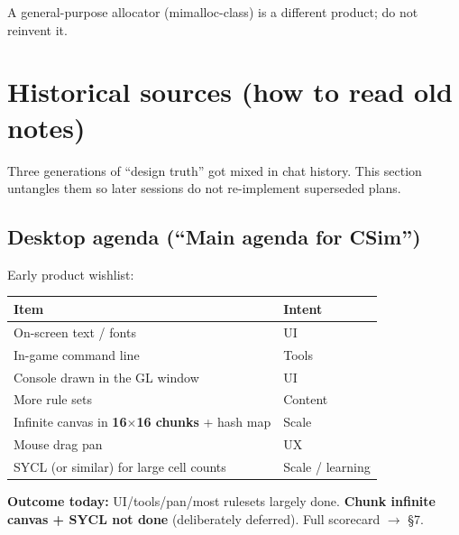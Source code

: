 \documentclass[10pt,a4paper]{article}
\begin{document}
A general-purpose allocator (mimalloc-class) is a different product; do not reinvent it.

\section{Historical sources (how to read old notes)}
Three generations of ``design truth'' got mixed in chat history. This section untangles them so later sessions do not re-implement superseded plans.

\subsection{Desktop agenda (``Main agenda for CSim'')}
Early product wishlist:
\begin{table}[h!]
\centering
\small
\begin{tabularx}{\textwidth}{l X}
\toprule
\textbf{Item} & \textbf{Intent} \\
\midrule
On-screen text / fonts & UI \\
In-game command line & Tools \\
Console drawn in the GL window & UI \\
More rule sets & Content \\
Infinite canvas in \textbf{16$\times$16 chunks} + hash map & Scale \\
Mouse drag pan & UX \\
SYCL (or similar) for large cell counts & Scale / learning \\
\bottomrule
\end{tabularx}
\end{table}

\noindent \textbf{Outcome today:} UI/tools/pan/most rulesets largely done. \textbf{Chunk infinite canvas + SYCL not done} (deliberately deferred). Full scorecard $\rightarrow$ \S 7.
\end{document}
